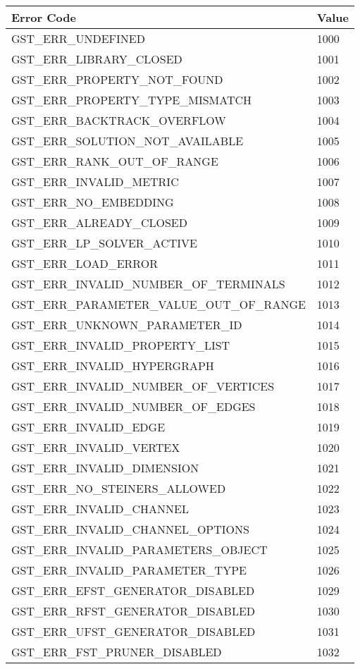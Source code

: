 \begin{tabular}{|l|l|}
\hline
Error Code & Value \\
\hline
GST\_ERR\_UNDEFINED & 1000 \\
GST\_ERR\_LIBRARY\_CLOSED & 1001 \\
GST\_ERR\_PROPERTY\_NOT\_FOUND & 1002 \\
GST\_ERR\_PROPERTY\_TYPE\_MISMATCH & 1003 \\
GST\_ERR\_BACKTRACK\_OVERFLOW & 1004 \\
GST\_ERR\_SOLUTION\_NOT\_AVAILABLE & 1005 \\
GST\_ERR\_RANK\_OUT\_OF\_RANGE & 1006 \\
GST\_ERR\_INVALID\_METRIC & 1007 \\
GST\_ERR\_NO\_EMBEDDING & 1008 \\
GST\_ERR\_ALREADY\_CLOSED & 1009 \\
GST\_ERR\_LP\_SOLVER\_ACTIVE & 1010 \\
GST\_ERR\_LOAD\_ERROR & 1011 \\
GST\_ERR\_INVALID\_NUMBER\_OF\_TERMINALS & 1012 \\
GST\_ERR\_PARAMETER\_VALUE\_OUT\_OF\_RANGE & 1013 \\
GST\_ERR\_UNKNOWN\_PARAMETER\_ID & 1014 \\
GST\_ERR\_INVALID\_PROPERTY\_LIST & 1015 \\
GST\_ERR\_INVALID\_HYPERGRAPH & 1016 \\
GST\_ERR\_INVALID\_NUMBER\_OF\_VERTICES & 1017 \\
GST\_ERR\_INVALID\_NUMBER\_OF\_EDGES & 1018 \\
GST\_ERR\_INVALID\_EDGE & 1019 \\
GST\_ERR\_INVALID\_VERTEX & 1020 \\
GST\_ERR\_INVALID\_DIMENSION & 1021 \\
GST\_ERR\_NO\_STEINERS\_ALLOWED & 1022 \\
GST\_ERR\_INVALID\_CHANNEL & 1023 \\
GST\_ERR\_INVALID\_CHANNEL\_OPTIONS & 1024 \\
GST\_ERR\_INVALID\_PARAMETERS\_OBJECT & 1025 \\
GST\_ERR\_INVALID\_PARAMETER\_TYPE & 1026 \\
GST\_ERR\_EFST\_GENERATOR\_DISABLED & 1029 \\
GST\_ERR\_RFST\_GENERATOR\_DISABLED & 1030 \\
GST\_ERR\_UFST\_GENERATOR\_DISABLED & 1031 \\
GST\_ERR\_FST\_PRUNER\_DISABLED & 1032 \\
\hline
\end{tabular}
